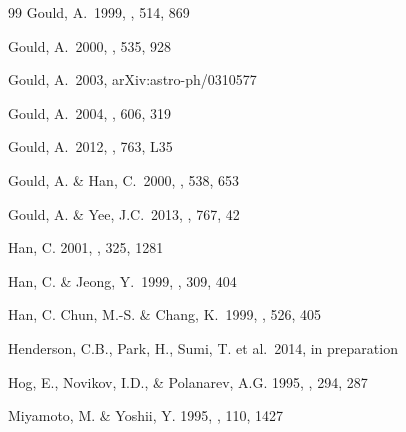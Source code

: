 \documentclass[12pt,preprint]{aastex}
\begin{document}
\begin{thebibliography}{99}
 Gould, A.\ 1999, \apj, 514, 869

 Gould, A.\ 2000, \apj, 535, 928

 Gould, A.\ 2003, arXiv:astro-ph/0310577

 Gould, A.\ 2004, \apj, 606, 319

 Gould, A.\ 2012, \apj, 763, L35


Gould, A. \& Han, C.\ 2000, \apj, 538, 653



Gould, A. \& Yee, J.C.\ 2013, \apj, 767, 42



 Han, C. 2001, \mnras, 325, 1281

 Han, C. \& Jeong, Y.\ 1999, \mnras, 309, 404

 Han, C. Chun, M.-S. \& Chang, K.\ 1999, 
\apj, 526, 405


 Henderson, C.B., Park, H.,
Sumi, T. et al.\ 2014, in preparation


Hog, E., Novikov, I.D., \& Polanarev, A.G. 1995, \aap, 294, 287

Miyamoto, M. \& Yoshii, Y. 1995, \aj, 110, 1427



\end{thebibliography}
\end{document}
